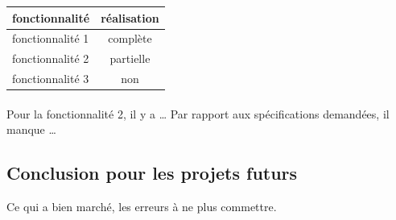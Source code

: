\documentclass[a4paper,oneside]{article}
\begin{document}
\begin{tabular}{| l | c |}
\hline
fonctionnalité & réalisation \\
\hline
\hline
fonctionnalité 1 & complète \\
\hline
fonctionnalité 2 & partielle \\
\hline
fonctionnalité 3 & non \\
\hline
\end{tabular}

\paragraph{}
Pour la fonctionnalité 2, il y a … Par rapport aux spécifications demandées, il manque …


\subsection{Conclusion pour les projets futurs}

Ce qui a bien marché, les erreurs à ne plus commettre.




\label{myLastPage}
\end{document}
